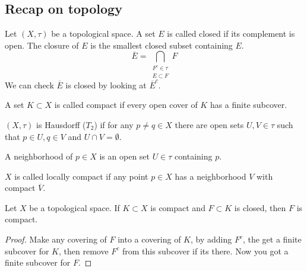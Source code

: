 

\chapter{}

\section{Recap on topology}
\begin{definition}
  Let $(X, \tau)$ be a topological space. A set $E$ is called closed if its complement is open. The closure of $E$ is the smallest closed subset containing $E$. \[
    \overline{E} = \bigcap_{\substack{F^c \in \tau \\ E \subset F}} F
  \]
  We can check $\overline{E}$ is closed by looking at $\overline{E}^c$.
\end{definition}

\begin{definition}
  A set $K \subset X$ is called compact if every open cover of $K$ has a finite subcover.
\end{definition}

\begin{definition}
  $(X, \tau)$ is Hausdorff ($T_2$) if for any $p \neq q \in X$ there are open sets $U, V \in \tau$ such that $ p \in U, q \in V$ and $ U \cap V  = \emptyset$. 
\end{definition}

\begin{definition}
   A neighborhood of $p \in X$ is an open set $U \in \tau$ containing $p$.
\end{definition}

\begin{definition}
  $X$ is called locally compact if any point $p \in X$ has a neighborhood $V$ with compact $\overline{V}$.
\end{definition}

\begin{theorem}
   Let $X$ be a topological space. If $K \subset X$ is compact and $F\subset K$ is closed, then $F$ is compact.
\end{theorem}
\begin{proof}
  Make any covering of $F$ into a covering of $K$, by adding $F^c$, the get a finite subcover for $K$, then remove $F^c$ from this subcover if its there. Now you got a finite subcover for $F$.
\end{proof}

